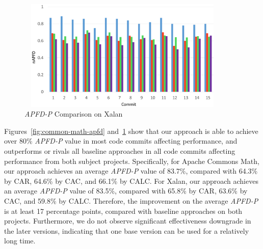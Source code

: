 \begin{figure}
		\centering
		\includegraphics[width=4in, height=2.1in]{performance/images/xalan-apfd.pdf}
			
		\caption{\textit{APFD-P} Comparison on Xalan}
	
		\label{fig:xalan-apfd}
\end{figure}

%

Figures~\ref{fig:common-math-apfd} and~\ref{fig:xalan-apfd} show that our approach is able to achieve over 80\% \textit{APFD-P} value in most code commits affecting performance, and outperforms or rivals all baseline approaches in all code commits affecting performance from both subject projects. Specifically, for Apache Commons Math, our approach achieves an average \textit{APFD-P} value of 83.7\%, compared with 64.3\% by CAR, 64.6\% by CAC, and 66.1\% by CALC. For Xalan, our approach achieves an average \textit{APFD-P} value of 83.5\%, compared with 65.8\% by CAR, 63.6\% by CAC, and 59.8\% by CALC. Therefore, the improvement on the average \textit{APFD-P} is at least 17 percentage points, compared with baseline approaches on both projects. Furthermore, we do not observe significant effectiveness downgrade in the later versions, indicating that one base version can be used for a relatively long time.


